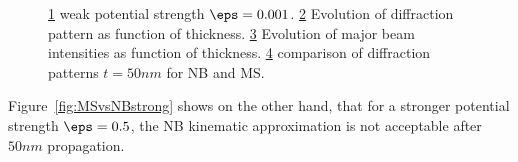\documentclass[a4paper,10pt]{article}
\begin{document}
\begin{figure}[h!]
	\begin{subfigure}{0.24\textwidth}
		\centering
    \def\svgwidth{\columnwidth}
		
		\caption{}\label{fig:MSvsNBweak_V}
	\end{subfigure}
	\begin{subfigure}{0.24\textwidth}
		\centering
    \def\svgwidth{\columnwidth}
		
		\caption{}\label{fig:MSvsNBweak_Iz}
	\end{subfigure}
  \begin{subfigure}{0.24\textwidth}
		\centering
    \def\svgwidth{\columnwidth}
		
		\caption{}\label{fig:MSvsNBweak_Bz}
	\end{subfigure}
	\begin{subfigure}{0.24\textwidth}
		\centering
    \def\svgwidth{\columnwidth}
		
		\caption{}\label{fig:MSvsNBweak_I}
	\end{subfigure}

	\caption[MS vs NB weak]{
		\ref{fig:MSvsNBweak_V} weak potential strength $\eps=0.001$.
		\ref{fig:MSvsNBweak_Iz} Evolution of diffraction pattern as function of thickness.
		\ref{fig:MSvsNBweak_Bz} Evolution of major beam intensities as function of thickness.
		\ref{fig:MSvsNBweak_I} comparison of diffraction patterns $t=50nm$ for NB and MS.
	}\label{fig:MSvsNBweak}
\end{figure}

Figure~\ref{fig:MSvsNBstrong} shows on the other hand, that for a stronger potential strength $\eps=0.5$, the NB kinematic approximation is not acceptable after $50nm$ propagation.
\end{document}
